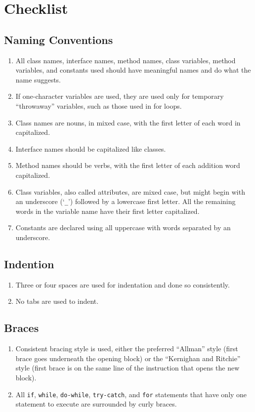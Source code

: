 
\chapter{Checklist}

\section*{Naming Conventions}
\begin{enumerate}
\item All class names, interface names, method names, class variables, method variables, and constants used should have meaningful names and do what the name suggests.
\item If one-character variables are used, they are used only for temporary “throwaway” variables, such as those used in for loops.
\item Class names are nouns, in mixed case, with the first letter of each word in capitalized.
\item Interface names should be capitalized like classes.
\item Method names should be verbs, with the first letter of each addition word capitalized.
\item Class variables, also called attributes, are mixed case, but might begin with an underscore (`\texttt{\_}') followed by a lowercase first letter. All the remaining words in the variable name have their first letter capitalized.
\item Constants are declared using all uppercase with words separated by an underscore.
\end{enumerate}

\section*{Indention}\begin{enumerate}[resume]
\item Three or four spaces are used for indentation and done so consistently.
\item No tabs are used to indent.
\end{enumerate}

\section*{Braces}\begin{enumerate}[resume]
\item Consistent bracing style is used, either the preferred “Allman” style (first brace goes underneath the opening block) or the “Kernighan and Ritchie” style (first brace is on the same line of the instruction that opens the new block).
\item All \texttt{if}, \texttt{while}, \texttt{do-while}, \texttt{try-catch}, and \texttt{for} statements that have only one statement to execute are surrounded by curly braces.
\end{enumerate}

